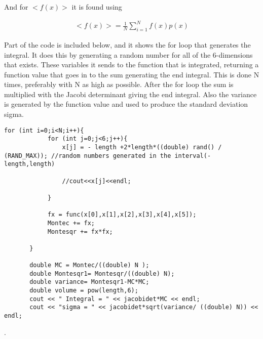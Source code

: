 And for $<f(x)>$ it is found using 

\begin{align}
<f(x)> = \frac{1}{N} \sum_{i=1}^{N} f(x)p(x) 
\label{eq:expf}
\end{align}

Part of the code is included below, and it shows the for loop that generates the integral. It does this by generating a random number for all of the 6-dimensions that exists. These variables it sends to the function that is integrated, returning a function value that goes in to the sum generating the end integral. This is done N times, preferably with N as high as possible. After the for loop the sum is multiplied with the Jacobi determinant giving the end integral. Also the variance is generated by the function value and used to produce the standard deviation sigma. 
  
\begin{lstlisting}
for (int i=0;i<N;i++){
            for (int j=0;j<6;j++){
                x[j] = - length +2*length*((double) rand() / (RAND_MAX)); //random numbers generated in the interval(-length,length)

                //cout<<x[j]<<endl;

            }

            fx = func(x[0],x[1],x[2],x[3],x[4],x[5]);
            Montec += fx;
            Montesqr += fx*fx;

       }

       double MC = Montec/((double) N );
       double Montesqr1= Montesqr/((double) N);
       double variance= Montesqr1-MC*MC;
       double volume = pow(length,6);
       cout << " Integral = " << jacobidet*MC << endl;
       cout << "sigma = " << jacobidet*sqrt(variance/ ((double) N)) << endl;

\end{lstlisting}


. 

